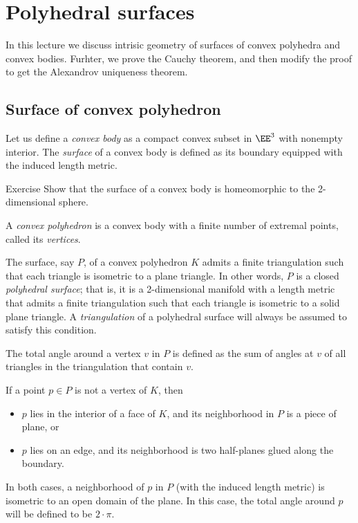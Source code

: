 \chapter{Polyhedral surfaces}\label{chap:alex-embedding}

In this lecture we discuss intrisic geometry of surfaces of convex polyhedra and convex bodies.
Furhter, we prove the Cauchy theorem, and then modify the proof to get the Alexandrov uniqueness theorem.

\section{Surface of convex polyhedron}

Let us define a \emph{convex body} as a compact convex subset in $\EE^3$ with nonempty interior.
The \emph{surface} of a convex body is defined as its boundary equipped with the induced length metric.

\begin{thm}{Exercise}\label{ex:surf-S2}
Show that the surface of a convex body is homeomorphic to the 2-dimensional sphere.
\end{thm}

A \emph{convex polyhedron} is a convex body with a finite number of extremal points, called its \emph{vertices}.

The surface, say $P$, of a convex polyhedron $K$ admits a finite triangulation such that each triangle is isometric to a plane triangle.
In other words, $P$ is a closed \emph{polyhedral surface};
that is, it is a 2-dimensional manifold with a length metric that admits a finite triangulation such that each triangle is isometric to a solid plane triangle.
A \emph{triangulation} of a polyhedral surface will always be assumed to satisfy this condition.

The total angle around a vertex $v$ in $P$ is defined as the sum of angles at $v$ of all triangles in the triangulation that contain $v$.

If a point $p\in P$ is not a vertex of $K$,
then
\begin{itemize}
\item $p$ lies in the interior of a face of $K$, and its neighborhood in $P$ is a piece of plane, or
\item $p$ lies on an edge, and its neighborhood is two half-planes glued along the boundary.
\end{itemize}
In both cases, a neighborhood of $p$ in $P$ (with the induced length metric) is isometric to an open domain of the plane.
In this case, the total angle around $p$ will be defined to be $2\cdot\pi$.

